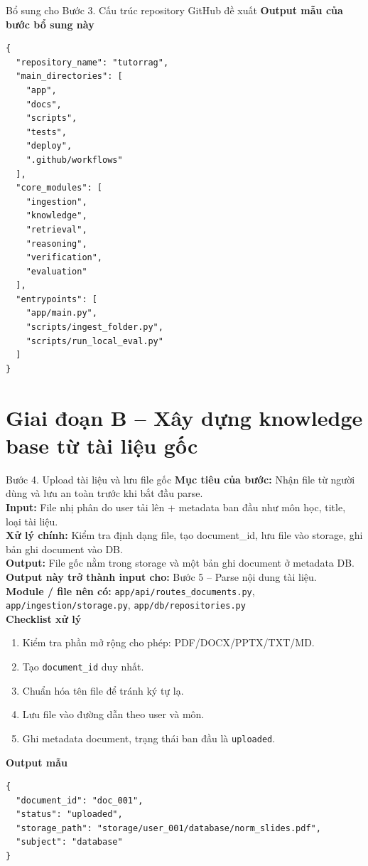 \documentclass[12pt,a4paper]{article}
\newcommand{\stepgoal}[1]{\textbf{Mục tiêu của bước:} #1\\}
\newcommand{\stepinput}[1]{\textbf{Input:} #1\\}
\newcommand{\stepprocess}[1]{\textbf{Xử lý chính:} #1\\}
\newcommand{\stepoutput}[1]{\textbf{Output:} #1\\}
\newcommand{\stepnext}[1]{\textbf{Output này trở thành input cho:} #1\\}
\newcommand{\stepmodules}[1]{\textbf{Module / file nên có:} #1\\}
\begin{document}
\begin{stepbox}{Bổ sung cho Bước 3. Cấu trúc repository GitHub đề xuất}
\textbf{Output mẫu của bước bổ sung này}
\begin{lstlisting}
{
  "repository_name": "tutorrag",
  "main_directories": [
    "app",
    "docs",
    "scripts",
    "tests",
    "deploy",
    ".github/workflows"
  ],
  "core_modules": [
    "ingestion",
    "knowledge",
    "retrieval",
    "reasoning",
    "verification",
    "evaluation"
  ],
  "entrypoints": [
    "app/main.py",
    "scripts/ingest_folder.py",
    "scripts/run_local_eval.py"
  ]
}
\end{lstlisting}
\end{stepbox}


\section{Giai đoạn B -- Xây dựng knowledge base từ tài liệu gốc}

\begin{stepbox}{Bước 4. Upload tài liệu và lưu file gốc}
\stepgoal{Nhận file từ người dùng và lưu an toàn trước khi bắt đầu parse.}
\stepinput{File nhị phân do user tải lên + metadata ban đầu như môn học, title, loại tài liệu.}
\stepprocess{Kiểm tra định dạng file, tạo document\_id, lưu file vào storage, ghi bản ghi document vào DB.}
\stepoutput{File gốc nằm trong storage và một bản ghi document ở metadata DB.}
\stepnext{Bước 5 -- Parse nội dung tài liệu.}
\stepmodules{\texttt{app/api/routes\_documents.py}, \texttt{app/ingestion/storage.py}, \texttt{app/db/repositories.py}}

\textbf{Checklist xử lý}
\begin{enumerate}[label=\arabic*.]
    \item Kiểm tra phần mở rộng cho phép: PDF/DOCX/PPTX/TXT/MD.
    \item Tạo \texttt{document\_id} duy nhất.
    \item Chuẩn hóa tên file để tránh ký tự lạ.
    \item Lưu file vào đường dẫn theo user và môn.
    \item Ghi metadata document, trạng thái ban đầu là \texttt{uploaded}.
\end{enumerate}

\textbf{Output mẫu}
\begin{lstlisting}
{
  "document_id": "doc_001",
  "status": "uploaded",
  "storage_path": "storage/user_001/database/norm_slides.pdf",
  "subject": "database"
}
\end{lstlisting}
\end{stepbox}
\end{document}
